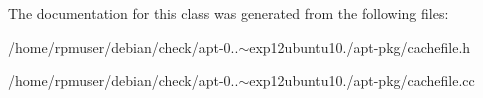 \-The documentation for this class was generated from the following files\-:\begin{DoxyCompactItemize}
\item 
/home/rpmuser/debian/check/apt-\/0..$\sim$exp12ubuntu10./apt-\/pkg/cachefile.\-h\item 
/home/rpmuser/debian/check/apt-\/0..$\sim$exp12ubuntu10./apt-\/pkg/cachefile.\-cc\end{DoxyCompactItemize}
